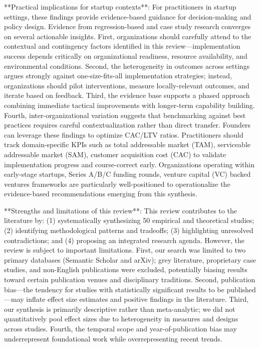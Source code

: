 \documentclass[11pt, a4paper]{article}
\begin{document}
**Practical implications for startup contexts**: For practitioners in startup settings, these findings provide evidence-based guidance for decision-making and policy design. Evidence from regression-based and case study research converges on several actionable insights. First, organizations should carefully attend to the contextual and contingency factors identified in this review—implementation success depends critically on organizational readiness, resource availability, and environmental conditions. Second, the heterogeneity in outcomes across settings argues strongly against one-size-fits-all implementation strategies; instead, organizations should pilot interventions, measure locally-relevant outcomes, and iterate based on feedback. Third, the evidence base supports a phased approach combining immediate tactical improvements with longer-term capability building. Fourth, inter-organizational variation suggests that benchmarking against best practices requires careful contextualization rather than direct transfer. Founders can leverage these findings to optimize CAC/LTV ratios. Practitioners should track domain-specific KPIs such as total addressable market (TAM), serviceable addressable market (SAM), customer acquisition cost (CAC) to validate implementation progress and course-correct early. Organizations operating within early-stage startups, Series A/B/C funding rounds, venture capital (VC) backed ventures frameworks are particularly well-positioned to operationalize the evidence-based recommendations emerging from this synthesis.

**Strengths and limitations of this review**: This review contributes to the literature by: (1) systematically synthesizing 50 empirical and theoretical studies; (2) identifying methodological patterns and tradeoffs; (3) highlighting unresolved contradictions; and (4) proposing an integrated research agenda. However, the review is subject to important limitations. First, our search was limited to two primary databases (Semantic Scholar and arXiv); grey literature, proprietary case studies, and non-English publications were excluded, potentially biasing results toward certain publication venues and disciplinary traditions. Second, publication bias—the tendency for studies with statistically significant results to be published—may inflate effect size estimates and positive findings in the literature. Third, our synthesis is primarily descriptive rather than meta-analytic; we did not quantitatively pool effect sizes due to heterogeneity in measures and designs across studies. Fourth, the temporal scope and year-of-publication bias may underrepresent foundational work while overrepresenting recent trends.
\end{document}
